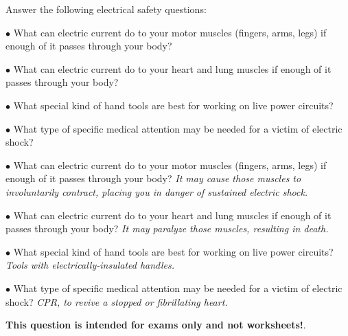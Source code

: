 

\noindent
Answer the following electrical safety questions:

\medskip
\item{$\bullet$} What can electric current do to your motor muscles (fingers, arms, legs) if enough of it passes through your body?
\vskip 15pt
\item{$\bullet$} What can electric current do to your heart and lung muscles if enough of it passes through your body?
\vskip 15pt
\item{$\bullet$} What special kind of hand tools are best for working on live power circuits?
\vskip 15pt
\item{$\bullet$} What type of specific medical attention may be needed for a victim of electric shock?
\medskip







\medskip
\item{$\bullet$} What can electric current do to your motor muscles (fingers, arms, legs) if enough of it passes through your body?  {\it It may cause those muscles to involuntarily contract, placing you in danger of sustained electric shock.}
\vskip 10pt
\item{$\bullet$} What can electric current do to your heart and lung muscles if enough of it passes through your body?  {\it It may paralyze those muscles, resulting in death.}
\vskip 10pt
\item{$\bullet$} What special kind of hand tools are best for working on live power circuits?  {\it Tools with electrically-insulated handles.}
\vskip 10pt
\item{$\bullet$} What type of specific medical attention may be needed for a victim of electric shock?  {\it CPR, to revive a stopped or fibrillating heart.}
\medskip







{\bf This question is intended for exams only and not worksheets!}.




